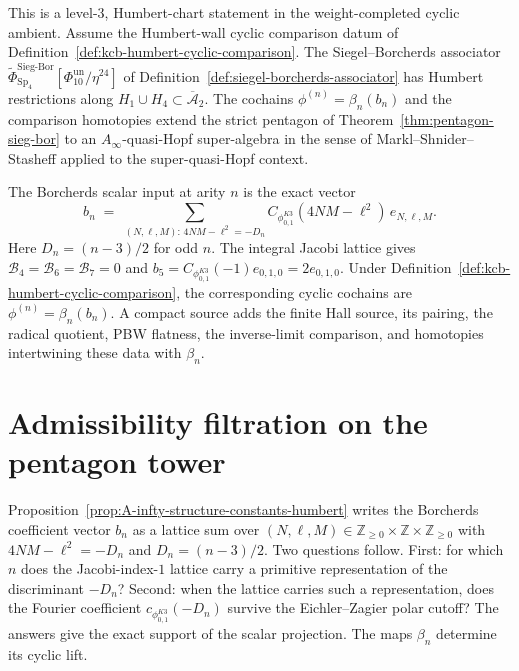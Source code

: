 \begin{theorem}
\label{thm:A-infty-upgrade}
This is a level-$3$, Humbert-chart statement in the weight-completed
cyclic ambient.  Assume the Humbert-wall cyclic comparison datum of
Definition~\ref{def:kcb-humbert-cyclic-comparison}.
The Siegel--Borcherds associator $\widetilde{\Phi}^{\mathrm{Sieg\text{-}Bor}}_{\mathrm{Sp}_4}[\Phi_{10}^{\mathrm{un}}/\eta^{24}]$
of Definition~\ref{def:siegel-borcherds-associator} has Humbert
restrictions along $H_1\cup H_4\subset\overline{\mathcal A}_2$.  The
cochains $\phi^{(n)}=\beta_n(b_n)$ and the comparison homotopies extend the
strict pentagon of Theorem~\ref{thm:pentagon-sieg-bor} to an
$A_\infty$-quasi-Hopf super-algebra in the sense of
Markl--Shnider--Stasheff applied to the super-quasi-Hopf context.
\end{theorem}

\begin{proposition}
\label{prop:A-infty-structure-constants-humbert}
The Borcherds scalar input at arity $n$ is the exact vector
\[
 b_n
 \;=\;
 \sum_{(N,\ell,M):\,4NM-\ell^2 = -D_n}
 C_{\phi^{K3}_{0,1}}(4NM-\ell^2)\,e_{N,\ell,M}.
\]
Here $D_n=(n-3)/2$ for odd $n$.  The integral Jacobi lattice gives
$\mathcal B_4=\mathcal B_6=\mathcal B_7=0$ and
$b_5=C_{\phi^{K3}_{0,1}}(-1)e_{0,1,0}=2e_{0,1,0}$.  Under
Definition~\ref{def:kcb-humbert-cyclic-comparison}, the corresponding
cyclic cochains are $\phi^{(n)}=\beta_n(b_n)$.  A compact source adds
the finite Hall source, its pairing, the radical quotient, PBW
flatness, the inverse-limit comparison, and homotopies intertwining
these data with $\beta_n$.
\end{proposition}

\section{Admissibility filtration on the pentagon tower}
\label{sec:admissibility-filtration}

Proposition~\ref{prop:A-infty-structure-constants-humbert} writes the
Borcherds coefficient vector $b_n$ as a lattice sum over
$(N,\ell,M)\in\mathbb{Z}_{\ge 0}\times\mathbb{Z}\times\mathbb{Z}_{\ge 0}$ with
$4NM-\ell^2 = -D_n$ and $D_n = (n-3)/2$. Two questions follow. First: for
which $n$ does the Jacobi-index-$1$ lattice carry a primitive representation
of the discriminant $-D_n$? Second: when the lattice carries such a
representation, does the Fourier coefficient
$c_{\phi^{K3}_{0,1}}(-D_n)$ survive the Eichler--Zagier polar cutoff?
The answers give the exact support of the scalar projection.  The maps
$\beta_n$ determine its cyclic lift.

